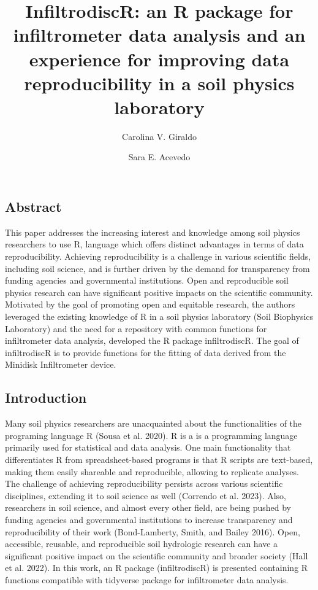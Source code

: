 \documentclass[
]{article}
\title{InfiltrodiscR: an R package for infiltrometer data analysis and
an experience for improving data reproducibility in a soil physics
laboratory}
\author[1]{Carolina V. Giraldo}
\author[1,2]{Sara E. Acevedo}
\affil[1]{Pontificia Universidad Católica de Chile}
\affil[2]{Centro de Desarrollo Urbano Sustentable (CEDEUS)}
\date{}
\begin{document}
\maketitle
\ifdefined\Shaded\renewenvironment{Shaded}{\begin{tcolorbox}[interior hidden, enhanced, borderline west={3pt}{0pt}{shadecolor}, sharp corners, breakable, boxrule=0pt, frame hidden]}{\end{tcolorbox}}\fi

\hypertarget{abstract}{%
\subsection{Abstract}\label{abstract}}

This paper addresses the increasing interest and knowledge among soil
physics researchers to use R, language which offers distinct advantages
in terms of data reproducibility. Achieving reproducibility is a
challenge in various scientific fields, including soil science, and is
further driven by the demand for transparency from funding agencies and
governmental institutions. Open and reproducible soil physics research
can have significant positive impacts on the scientific community.
Motivated by the goal of promoting open and equitable research, the
authors leveraged the existing knowledge of R in a soil physics
laboratory (Soil Biophysics Laboratory) and the need for a repository
with common functions for infiltrometer data analysis, developed the R
package infiltrodiscR. The goal of infiltrodiscR is to provide functions
for the fitting of data derived from the Minidisk Infiltrometer device.

\hypertarget{introduction}{%
\subsection{Introduction}\label{introduction}}

Many soil physics researchers are unacquainted about the functionalities
of the programing language R (Sousa et al. 2020). R is a is a
programming language primarily used for statistical and data analysis.
One main functionality that differentiates R from spreadsheet-based
programs is that R scripts are text-based, making them easily shareable
and reproducible, allowing to replicate analyses. The challenge of
achieving reproducibility persists across various scientific
disciplines, extending it to soil science as well (Correndo et al.
2023). Also, researchers in soil science, and almost every other field,
are being pushed by funding agencies and governmental institutions to
increase transparency and reproducibility of their work (Bond-Lamberty,
Smith, and Bailey 2016). Open, accessible, reusable, and reproducible
soil hydrologic research can have a significant positive impact on the
scientific community and broader society (Hall et al. 2022). In this
work, an R package (infiltrodiscR) is presented containing R functions
compatible with tidyverse package for infiltrometer data analysis.
\end{document}
